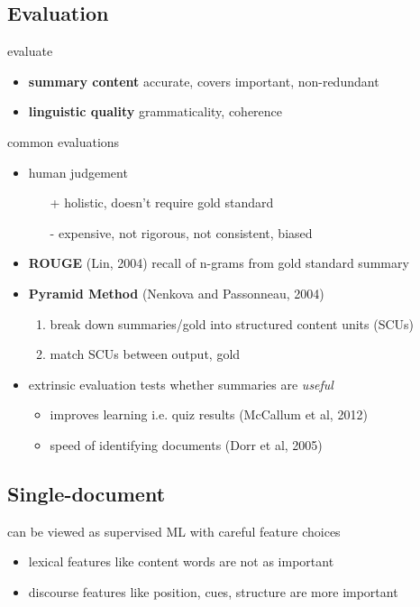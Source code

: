 \documentclass[]{article}
\theoremstyle{definition}
\begin{document}
\subsection{Evaluation}%
\label{sub:sum_evaluation}

evaluate
\begin{itemize}
    \item \textbf{summary content} accurate, covers important, non-redundant
    \item \textbf{linguistic quality} grammaticality, coherence
\end{itemize}


common evaluations
\begin{itemize}
    \item human judgement
        \begin{itemize}
            \item[+] holistic, doesn't require gold standard
            \item[-] expensive, not rigorous, not consistent, biased
        \end{itemize}
    \item \textbf{ROUGE} (Lin, 2004) recall of n-grams from gold standard summary
    \item \textbf{Pyramid Method} (Nenkova and Passonneau, 2004)
        \begin{enumerate}
            \item break down summaries/gold into structured content units (SCUs)
            \item match SCUs between output, gold
        \end{enumerate}
    \item extrinsic evaluation tests whether summaries are \textit{useful}
        \begin{itemize}
            \item improves learning i.e. quiz results (McCallum et al, 2012)
            \item speed of identifying documents (Dorr et al, 2005)
        \end{itemize}
\end{itemize}


\subsection{Single-document}%
\label{sub:single_document}

can be viewed as supervised ML with careful feature choices
\begin{itemize}
    \item lexical features like content words are not as important
    \item discourse features like position, cues, structure are more important
\end{itemize}
\end{document}
